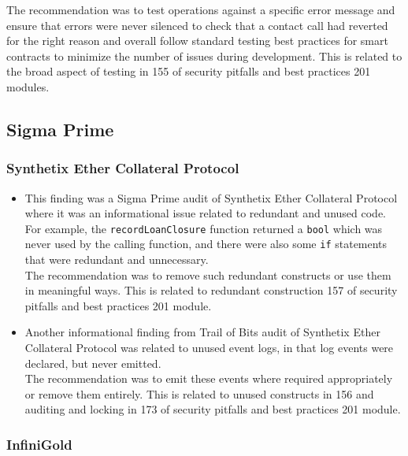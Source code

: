 The recommendation was to test operations against a specific error
message and ensure that errors were never silenced to check that a
contact call had reverted for the right reason and overall follow
standard testing best practices for smart contracts to minimize the
number of issues during development. This is related to the broad aspect
of testing in 155 of security pitfalls and best practices 201 modules.

\subsection{Sigma Prime}\label{sigma-prime}

\subsubsection{Synthetix Ether Collateral
Protocol}\label{synthetix-ether-collateral-protocol}

\begin{itemize}
\item
  This finding was a Sigma Prime audit of Synthetix Ether Collateral
  Protocol where it was an informational issue related to redundant and
  unused code. For example, the \texttt{recordLoanClosure} function
  returned a \texttt{bool} which was never used by the calling function,
  and there were also some \texttt{if} statements that were redundant
  and unnecessary.\\

  The recommendation was to remove such redundant constructs or use them
  in meaningful ways. This is related to redundant construction 157 of
  security pitfalls and best practices 201 module.
\item
  Another informational finding from Trail of Bits audit of Synthetix
  Ether Collateral Protocol was related to unused event logs, in that
  log events were declared, but never emitted.\\

  The recommendation was to emit these events where required
  appropriately or remove them entirely. This is related to unused
  constructs in 156 and auditing and locking in 173 of security pitfalls
  and best practices 201 module.
\end{itemize}

\subsubsection{InfiniGold}\label{infinigold}

